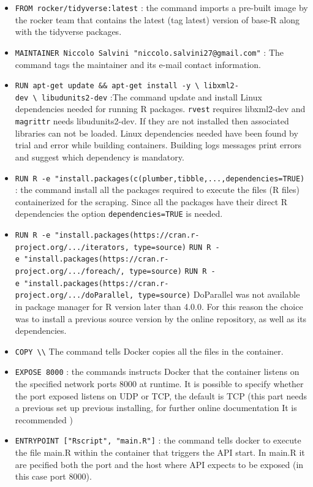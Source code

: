 \documentclass[
  12pt,
  a4paper,
  oneside]{book}
\begin{document}
\begin{itemize}
\item
  \texttt{FROM\ rocker/tidyverse:latest} : the command imports a pre-built image by the rocker team that contains the latest (tag latest) version of base-R along with the tidyverse packages.
\item
  \texttt{MAINTAINER\ Niccolo\ Salvini\ "niccolo.salvini27@gmail.com"} : The command tags the maintainer and its e-mail contact information.
\item
  \texttt{RUN\ apt-get\ update\ \&\&\ apt-get\ install\ -y\ \textbackslash{}\ libxml2-dev\ \textbackslash{}\ libudunits2-dev} :The command update and install Linux dependencies needed for running R packages. \texttt{rvest} requires libxml2-dev and \texttt{magrittr} needs libudunits2-dev. If they are not installed then associated libraries can not be loaded. Linux dependencies needed have been found by trial and error while building containers. Building logs messages print errors and suggest which dependency is mandatory.
\item
  \texttt{RUN\ R\ -e\ "install.packages(c(\textquotesingle{}plumber\textquotesingle{},\textquotesingle{}tibble\textquotesingle{},\textquotesingle{}...\textquotesingle{},dependencies=TRUE)} : the command install all the packages required to execute the files (R files) containerized for the scraping. Since all the packages have their direct R dependencies the option \texttt{dependencies=TRUE} is needed.
\item
  \texttt{RUN\ R\ -e\ "install.packages(\textquotesingle{}https://cran.r-project.org/.../iterators,\ type=\textquotesingle{}source\textquotesingle{})}
  \texttt{RUN\ R\ -e\ "install.packages(\textquotesingle{}https://cran.r-project.org/.../foreach/,\ type=\textquotesingle{}source\textquotesingle{})}
  \texttt{RUN\ R\ -e\ "install.packages(\textquotesingle{}https://cran.r-project.org/.../doParallel,\ type=\textquotesingle{}source\textquotesingle{})}
  DoParallel was not available in package manager for R version later than 4.0.0. For this reason the choice was to install a previous source version by the online repository, as well as its dependencies.
\item
  \texttt{COPY\ \textbackslash{}\textbackslash{}} The command tells Docker copies all the files in the container.
\item
  \texttt{EXPOSE\ 8000} : the commands instructs Docker that the container listens on the specified network ports 8000 at runtime. It is possible to specify whether the port exposed listens on UDP or TCP, the default is TCP (this part needs a previous set up previous installing, for further online documentation It is recommended \citep{docker_documentation_2020} )
\item
  \texttt{ENTRYPOINT\ {[}"Rscript",\ "main.R"{]}} : the command tells docker to execute the file main.R within the container that triggers the API start. In main.R it are pecified both the port and the host where API expects to be exposed (in this case port 8000).
\end{itemize}
\end{document}
